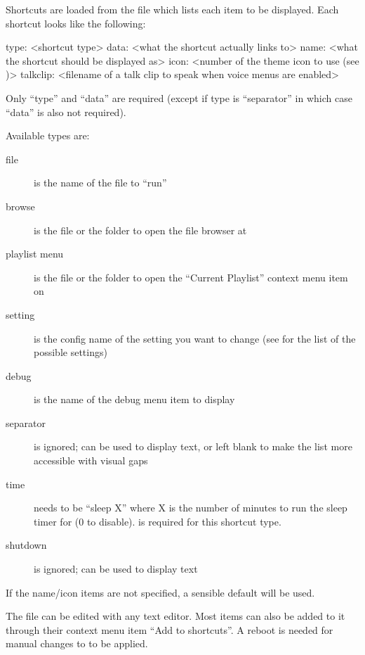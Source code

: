 
Shortcuts are loaded from the file  which lists
each item to be displayed. Each shortcut looks like the following:

\begin{example}
    [shortcut]
    type: <shortcut type>
    data: <what the shortcut actually links to>
    name: <what the shortcut should be displayed as>
    icon: <number of the theme icon to use (see )>
    talkclip: <filename of a talk clip to speak when voice menus are enabled>
\end{example}

Only ``type'' and ``data'' are required (except if type is ``separator'' in which case
``data'' is also not required).

Available types are:
\begin{description}
\item[file]  is the name of the file to ``run''
\item[browse]  is the file or the folder to open the file browser at
\item[playlist menu]  is the file or the folder to open the
  ``Current Playlist'' context menu item on
\item[setting]  is the config name of the setting you want to change
  (see  for the list of the possible settings)
\item[debug]  is the name of the debug menu item to display
\item[separator]  is ignored;  can be used to display text,
  or left blank to make the list more accessible with visual gaps
\item[time]  needs to be ``sleep X''
  where X is the number of minutes to run the sleep timer for (0 to disable). 
  is required for this shortcut type.
\item[shutdown]  is ignored;  can be used to display text
\end{description}

If the name/icon items are not specified, a sensible default will be used.


The file  can be edited with any text editor. Most items can
also be added to it through their context menu item ``Add to shortcuts''.
A reboot is needed for manual changes to  to be applied.

